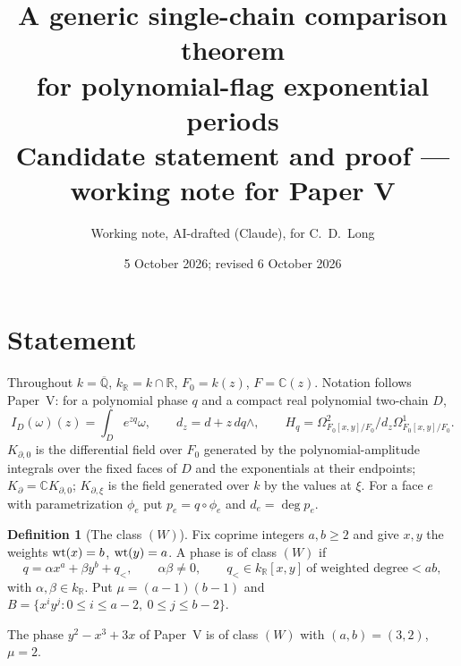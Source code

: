 \documentclass[11pt]{article}
\title{A generic single-chain comparison theorem\\ for polynomial-flag exponential periods\\[4pt]
\large Candidate statement and proof --- working note for Paper V}
\author{Working note, AI-drafted (Claude), for C.~D.~Long}
\date{5 October 2026; revised 6 October 2026}
\numberwithin{equation}{section}
\theoremstyle{definition}
\newtheorem{definition}[theorem]{Definition}
\theoremstyle{remark}
\newcommand{\C}{\mathbb C}\newcommand{\Q}{\mathbb Q}\newcommand{\R}{\mathbb R}\newcommand{\Z}{\mathbb Z}
\newcommand{\Qbar}{\overline{\mathbb Q}}
\newcommand{\Hq}{H_q}
\begin{document}
\maketitle

\noindent{}

\section{Statement}

Throughout $k=\Qbar$, $k_\R=k\cap\R$, $F_0=k(z)$, $F=\C(z)$. Notation follows
Paper~V: for a polynomial phase $q$ and a compact real polynomial two-chain $D$,
\[
 I_D(\omega)(z)=\int_D e^{zq}\omega,\qquad d_z=d+z\,dq\wedge,\qquad
 \Hq=\Omega^2_{F_0[x,y]/F_0}/d_z\Omega^1_{F_0[x,y]/F_0}.
\]
$K_{\partial,0}$ is the differential field over $F_0$ generated by the
polynomial-amplitude integrals over the fixed faces of $D$ and the
exponentials at their endpoints; $K_\partial=\C K_{\partial,0}$;
$K_{\partial,\xi}$ is the field generated over $k$ by the values at $\xi$.
For a face $e$ with parametrization $\phi_e$ put $p_e=q\circ\phi_e$ and
$d_e=\deg p_e$.

\begin{definition}[The class $(W)$]\label{def:W}
Fix coprime integers $a,b\ge2$ and give $x,y$ the weights $\operatorname{wt}(x)=b$,
$\operatorname{wt}(y)=a$. A phase is of class $(W)$ if
\[
 q=\alpha x^a+\beta y^b+q_<,\qquad \alpha\beta\ne0,\qquad
 q_<\in k_\R[x,y]\ \text{of weighted degree}<ab,
\]
with $\alpha,\beta\in k_\R$. Put $\mu=(a-1)(b-1)$ and
$B=\{x^iy^j:0\le i\le a-2,\ 0\le j\le b-2\}$.
\end{definition}

The phase $y^2-x^3+3x$ of Paper~V is of class $(W)$ with $(a,b)=(3,2)$, $\mu=2$.
\end{document}
